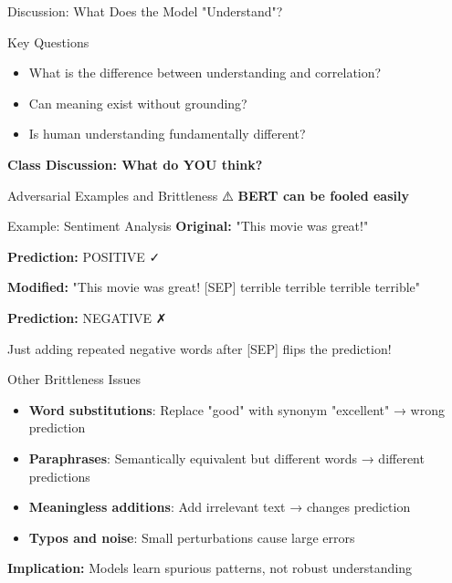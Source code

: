 \documentclass[aspectratio=169]{beamer}
\begin{document}
\begin{frame}[shrink=10]{Discussion: What Does the Model "Understand"? 🤔}
\begin{block}{Key Questions}
\begin{itemize}\setlength{\itemsep}{0pt}
    \item What is the difference between understanding and correlation?
    \item Can meaning exist without grounding?
    \item Is human understanding fundamentally different?
\end{itemize}
\end{block}

\textbf{Class Discussion: What do YOU think?}
\end{frame}

\begin{frame}{Adversarial Examples and Brittleness ⚠️}
\textbf{BERT can be fooled easily}

\vspace{1em}

\begin{exampleblock}{Example: Sentiment Analysis}
\textbf{Original:} "This movie was great!"

\textbf{Prediction:} POSITIVE ✓

\vspace{0.5em}

\textbf{Modified:} "This movie was great! [SEP] terrible terrible terrible terrible"

\textbf{Prediction:} NEGATIVE ✗

\vspace{0.5em}

Just adding repeated negative words after [SEP] flips the prediction!
\end{exampleblock}

\vspace{1em}

\begin{alertblock}{Other Brittleness Issues}
\begin{itemize}\setlength{\itemsep}{0pt}
    \item \textbf{Word substitutions}: Replace "good" with synonym "excellent" → wrong prediction
    \item \textbf{Paraphrases}: Semantically equivalent but different words → different predictions
    \item \textbf{Meaningless additions}: Add irrelevant text → changes prediction
    \item \textbf{Typos and noise}: Small perturbations cause large errors
\end{itemize}
\end{alertblock}

\vspace{0.5em}

\textbf{Implication:} Models learn spurious patterns, not robust understanding
\end{frame}
\end{document}
